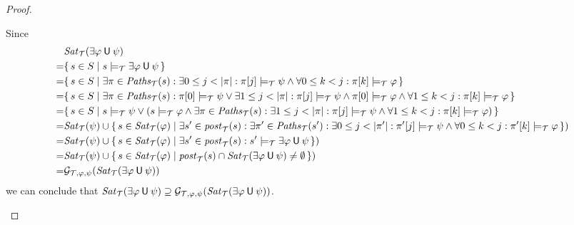 \documentclass[12pt]{article}
\newcommand{\until}{\mathbin{\sf U}}
\theoremstyle{definition}
\begin{document}
\begin{proof}
\begin{itemize}
Since
\begin{align*}
& \mathit{Sat}_{\mathcal{T}}(\exists \varphi \until \psi)\\
= & \{\, s \in S \mid s \models_{\mathcal{T}} \exists \varphi \until \psi \,\}\\
= & \{\, s \in S \mid \exists \pi \in \mathit{Paths}_{\mathcal{T}}(s) : \exists 0 \leq j < |\pi| : \pi[j] \models_{\mathcal{T}} \psi \wedge \forall 0 \leq k < j : \pi[k] \models_{\mathcal{T}} \varphi \,\}\\
= & \{\, s \in S \mid \exists \pi \in \mathit{Paths}_{\mathcal{T}}(s) : \pi[0] \models_{\mathcal{T}} \psi \vee \exists 1 \leq j < |\pi| : \pi[j] \models_{\mathcal{T}} \psi \wedge \pi[0] \models_{\mathcal{T}} \varphi \wedge \forall 1 \leq k < j : \pi[k] \models_{\mathcal{T}} \varphi \,\}\\
= & \{\, s \in S \mid s \models_{\mathcal{T}} \psi \vee (s \models_{\mathcal{T}} \varphi \wedge \exists \pi \in \mathit{Paths}_{\mathcal{T}}(s) : \exists 1 \leq j < |\pi| : \pi[j] \models_{\mathcal{T}} \psi \wedge \forall 1 \leq k < j : \pi[k] \models_{\mathcal{T}} \varphi) \,\}\\
= & \mathit{Sat}_{\mathcal{T}}(\psi) \cup \{\, s \in \mathit{Sat}_{\mathcal{T}}(\varphi) \mid \exists s' \in \mathit{post}_{\mathcal{T}}(s) : \exists \pi' \in \mathit{Paths}_{\mathcal{T}}(s') : \exists 0 \leq j < |\pi'| : \pi'[j] \models_{\mathcal{T}} \psi \wedge \forall 0 \leq k < j : \pi'[k] \models_{\mathcal{T}} \varphi \,\})\\
= & \mathit{Sat}_{\mathcal{T}}(\psi) \cup \{\, s \in \mathit{Sat}_{\mathcal{T}}(\varphi) \mid \exists s' \in \mathit{post}_{\mathcal{T}}(s) : s' \models_{\mathcal{T}} \exists \varphi \until \psi \,\})\\
= & \mathit{Sat}_{\mathcal{T}}(\psi) \cup \{\, s \in \mathit{Sat}_{\mathcal{T}}(\varphi) \mid \mathit{post}_{\mathcal{T}}(s) \cap \mathit{Sat}_{\mathcal{T}}(\exists \varphi \until \psi) \not= \emptyset \,\})\\
= & \mathcal{G}_{\mathcal{T}, \varphi,\psi}(\mathit{Sat}_{\mathcal{T}}(\exists \varphi \until \psi))
\end{align*}
we can conclude that $\mathit{Sat}_{\mathcal{T}}(\exists \varphi \until \psi) \supseteq \mathcal{G}_{\mathcal{T}, \varphi,\psi}(\mathit{Sat}_{\mathcal{T}}(\exists \varphi \until \psi))$.


\end{itemize}
\end{proof}
\end{document}
